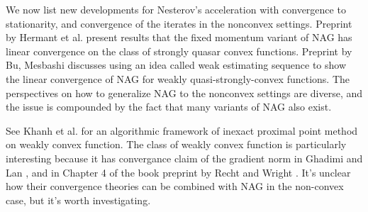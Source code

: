 \documentclass[12pt]{article}
\begin{document}
            \par
            We now list new developments for Nesterov's acceleration with convergence to stationarity, and convergence of the iterates in the nonconvex settings.
            Preprint by Hermant et al. \cite{hermant_study_2024} present results that the fixed momentum variant of NAG has linear convergence  on the class of strongly quasar convex functions. 
            Preprint by Bu, Mesbashi \cite{bu_note_2020} discusses using an idea called weak estimating sequence to show the linear convergence of NAG for weakly quasi-strongly-convex functions. 
            The perspectives on how to generalize NAG to the nonconvex settings are diverse, and the issue is compounded by the fact that many variants of NAG also exist. 
            \par
            See Khanh et al. \cite{khanh_inexact_2025} for an algorithmic framework of inexact proximal point method on weakly convex function. 
            The class of weakly convex function is particularly interesting because it has convergance claim of the gradient norm in Ghadimi and Lan \cite{ghadimi_accelerated_2016}, and in Chapter 4 of the book preprint by Recht and Wright \cite{recht_optimization_nodate}. 
            It's unclear how their convergence theories can be combined with NAG in the non-convex case, but it's worth investigating. 
\end{document}
